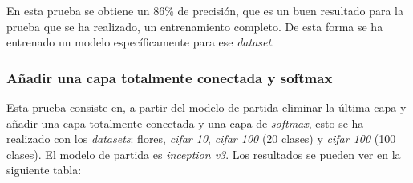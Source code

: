 \documentclass[12pt,a4paper]{article}
\begin{document}
En esta prueba se obtiene un 86\% de precisión, que es un buen resultado para la prueba que se ha realizado, un entrenamiento completo. De esta forma se ha entrenado un modelo específicamente para ese \textit{dataset}.

\subsubsection{Añadir una capa totalmente conectada y softmax}
Esta prueba consiste en, a partir del modelo de partida eliminar la última capa y añadir una capa totalmente conectada y una capa de \textit{softmax}, esto se ha realizado con los \textit{datasets}: flores, \textit{cifar 10}, \textit{cifar 100} (20 clases) y \textit{cifar 100} (100 clases). El modelo de partida es \textit{inception v3}. Los resultados se pueden ver en la siguiente tabla:

\begin{table}[H]
\centering
{}
\caption{Resultados añadir una capa totalmente conectada y \textit{softmax}.}
\end{table}
\end{document}
